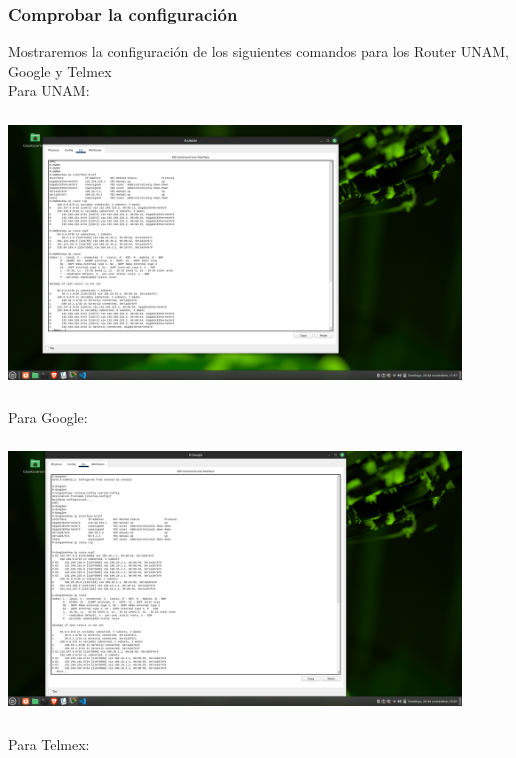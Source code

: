 \documentclass[14pt]{book}
\begin{document}
{\color{blue} \subsubsection*{\textbf{Comprobar la configuración}}}
\vspace{1em}

Mostraremos la configuración de los siguientes comandos para los Router UNAM, Google y
Telmex\\

Para UNAM:\\

\includegraphics[width=12cm, height=8cm]{images/comandos UNAM.png}\\

Para Google:\\

\includegraphics[width=12cm, height=8cm]{images/comandos GOOGLE.png}\\

Para Telmex:\\
\end{document}
